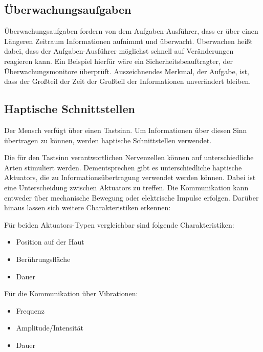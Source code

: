 \documentclass{llncs}					%
\begin{document}
\newpage
\subsection{Überwachungsaufgaben}
Überwachungsaufgaben fordern von dem Aufgaben-Ausführer, dass er über einen Längeren Zeitraum Informationen aufnimmt und überwacht. Überwachen heißt dabei, dass der Aufgaben-Ausführer möglichst schnell auf Veränderungen reagieren kann. Ein Beispiel hierfür wäre ein Sicherheitsbeauftragter, der Überwachungsmonitore überprüft. Auszeichnendes Merkmal, der Aufgabe, ist, dass der Großteil der Zeit der Großteil der Informationen unverändert bleiben.

\newpage
\subsection{Haptische Schnittstellen}
Der Mensch verfügt über einen Tastsinn. Um Informationen über diesen Sinn übertragen zu können, werden haptische Schnittstellen verwendet. 

 
Die für den Tastsinn verantwortlichen Nervenzellen können auf unterschiedliche Arten stimuliert werden. Dementsprechen gibt es unterschiedliche haptische \glspl{Aktuator}, die zu Informationsübertragung verwendet werden können. Dabei ist eine Unterscheidung zwischen \glspl{Aktuator} zu treffen. Die Kommunikation kann entweder über mechanische Bewegung oder elektrische Impulse erfolgen. Darüber hinaus lassen sich weitere Charakteristiken erkennen:

Für beiden \glspl{Aktuator}-Typen vergleichbar sind folgende Charakteristiken:
\begin{itemize}
	\item Position auf der Haut
	
	\item Berührungsfläche
	
	\item Dauer
\end{itemize}

Für die Kommunikation über Vibrationen\cite{doi:10.1518/001872008X250638}:
\begin{itemize}
	\item Frequenz
	\item Amplitude/Intensität %
	\item Dauer
\end{itemize}
\end{document}
